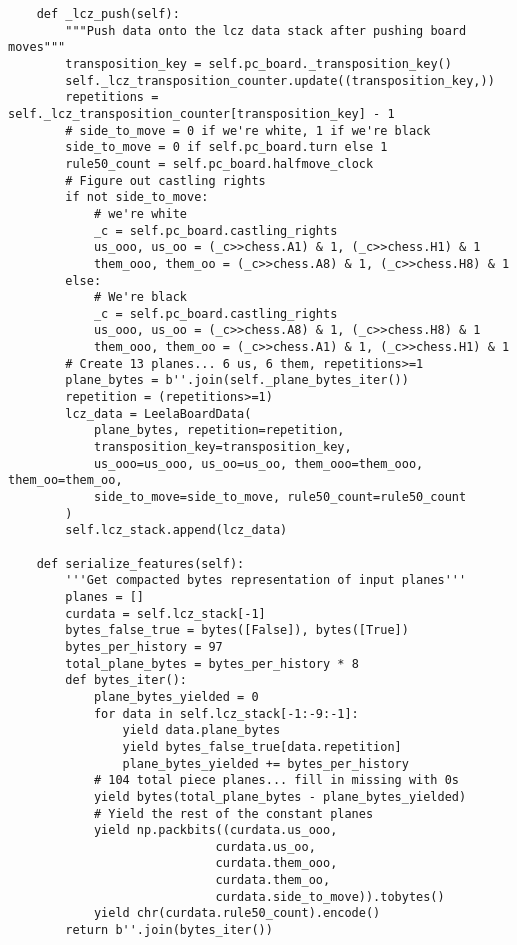 \begin{verbatim}
    def _lcz_push(self):
        """Push data onto the lcz data stack after pushing board moves"""
        transposition_key = self.pc_board._transposition_key()
        self._lcz_transposition_counter.update((transposition_key,))
        repetitions = self._lcz_transposition_counter[transposition_key] - 1
        # side_to_move = 0 if we're white, 1 if we're black
        side_to_move = 0 if self.pc_board.turn else 1
        rule50_count = self.pc_board.halfmove_clock
        # Figure out castling rights
        if not side_to_move:
            # we're white
            _c = self.pc_board.castling_rights
            us_ooo, us_oo = (_c>>chess.A1) & 1, (_c>>chess.H1) & 1
            them_ooo, them_oo = (_c>>chess.A8) & 1, (_c>>chess.H8) & 1
        else: 
            # We're black
            _c = self.pc_board.castling_rights
            us_ooo, us_oo = (_c>>chess.A8) & 1, (_c>>chess.H8) & 1
            them_ooo, them_oo = (_c>>chess.A1) & 1, (_c>>chess.H1) & 1
        # Create 13 planes... 6 us, 6 them, repetitions>=1
        plane_bytes = b''.join(self._plane_bytes_iter())
        repetition = (repetitions>=1)
        lcz_data = LeelaBoardData(
            plane_bytes, repetition=repetition,
            transposition_key=transposition_key,
            us_ooo=us_ooo, us_oo=us_oo, them_ooo=them_ooo, them_oo=them_oo,
            side_to_move=side_to_move, rule50_count=rule50_count
        )
        self.lcz_stack.append(lcz_data)
        
    def serialize_features(self):
        '''Get compacted bytes representation of input planes'''
        planes = []
        curdata = self.lcz_stack[-1]
        bytes_false_true = bytes([False]), bytes([True])
        bytes_per_history = 97
        total_plane_bytes = bytes_per_history * 8
        def bytes_iter():
            plane_bytes_yielded = 0
            for data in self.lcz_stack[-1:-9:-1]:
                yield data.plane_bytes
                yield bytes_false_true[data.repetition]
                plane_bytes_yielded += bytes_per_history
            # 104 total piece planes... fill in missing with 0s
            yield bytes(total_plane_bytes - plane_bytes_yielded)
            # Yield the rest of the constant planes
            yield np.packbits((curdata.us_ooo,
                             curdata.us_oo,
                             curdata.them_ooo,
                             curdata.them_oo,
                             curdata.side_to_move)).tobytes()
            yield chr(curdata.rule50_count).encode()
        return b''.join(bytes_iter())
    

\end{verbatim}
